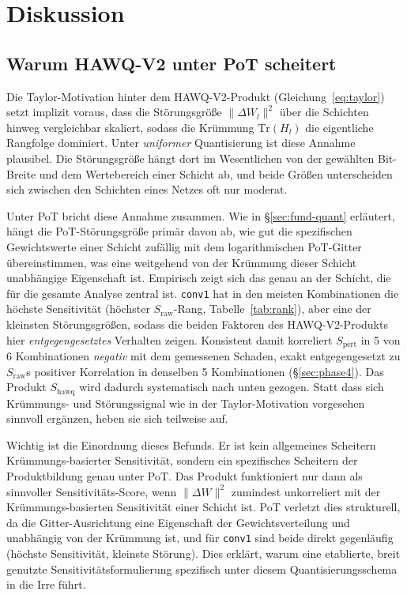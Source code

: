 \section{Diskussion}
\label{sec:discussion}

\subsection{Warum HAWQ-V2 unter PoT scheitert}
\label{sec:disc-hawq}

Die Taylor-Motivation hinter dem HAWQ-V2-Produkt (Gleichung~\eqref{eq:taylor}) setzt implizit voraus, dass die Störungsgröße $\|\Delta W_l\|^2$ über die Schichten hinweg vergleichbar skaliert, sodass die Krümmung $\mathrm{Tr}(H_l)$ die eigentliche Rangfolge dominiert. Unter \emph{uniformer} Quantisierung ist diese Annahme plausibel. Die Störungsgröße hängt dort im Wesentlichen von der gewählten Bit-Breite und dem Wertebereich einer Schicht ab, und beide Größen unterscheiden sich zwischen den Schichten eines Netzes oft nur moderat.
\par\medskip

Unter PoT bricht diese Annahme zusammen. Wie in \S\ref{sec:fund-quant} erläutert, hängt die PoT-Störungsgröße primär davon ab, wie gut die spezifischen Gewichtswerte einer Schicht zufällig mit dem logarithmischen PoT-Gitter übereinstimmen, was eine weitgehend von der Krümmung dieser Schicht unabhängige Eigenschaft ist. Empirisch zeigt sich das genau an der Schicht, die für die gesamte Analyse zentral ist. \texttt{conv1} hat in den meisten Kombinationen die höchste Sensitivität (höchster $S_{\mathrm{raw}}$-Rang, Tabelle~\ref{tab:rank}), aber eine der kleinsten Störungsgrößen, sodass die beiden Faktoren des HAWQ-V2-Produkts hier \emph{entgegengesetztes} Verhalten zeigen. Konsistent damit korreliert $S_{\mathrm{pert}}$ in 5 von 6 Kombinationen \emph{negativ} mit dem gemessenen Schaden, exakt entgegengesetzt zu $S_{\mathrm{raw}}$s positiver Korrelation in denselben 5 Kombinationen (\S\ref{sec:phase4}). Das Produkt $S_{\mathrm{hawq}}$ wird dadurch systematisch nach unten gezogen. Statt dass sich Krümmungs- und Störungssignal wie in der Taylor-Motivation vorgesehen sinnvoll ergänzen, heben sie sich teilweise auf.
\par\medskip

Wichtig ist die Einordnung dieses Befunds. Er ist kein allgemeines Scheitern Krümmungs-basierter Sensitivität, sondern ein spezifisches Scheitern der Produktbildung genau unter PoT. Das Produkt funktioniert nur dann als sinnvoller Sensitivitäts-Score, wenn $\|\Delta W\|^2$ zumindest unkorreliert mit der Krümmungs-basierten Sensitivität einer Schicht ist. PoT verletzt dies strukturell, da die Gitter-Ausrichtung eine Eigenschaft der Gewichtsverteilung und unabhängig von der Krümmung ist, und für \texttt{conv1} sind beide direkt gegenläufig (höchste Sensitivität, kleinste Störung). Dies erklärt, warum eine etablierte, breit genutzte Sensitivitätsformulierung spezifisch unter diesem Quantisierungsschema in die Irre führt.

